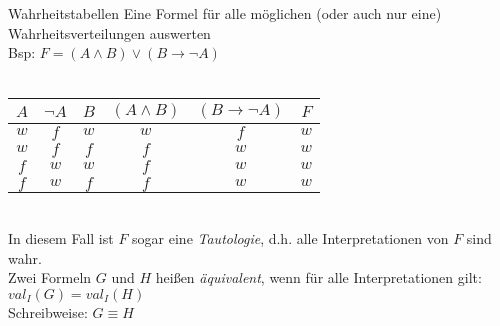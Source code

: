 \begin{frame}{Wahrheitstabellen}
 Eine Formel für alle möglichen (oder auch nur eine) Wahrheitsverteilungen auswerten\\
 Bsp: $F = (A\wedge B)\vee(B\rightarrow\neg A)$\\
 \textcolor{white}{.}\\ %
 \begin{tabular}{ccc|cc|c}
  $A$ & $\neg A$ & $B$ & $(A\wedge B)$ & $(B\rightarrow\neg A)$ & $F$ \\
  \hline
  $w$ & $f$      & $w$ & $w$           & $f$                    & $w$ \\
  $w$ & $f$      & $f$ & $f$           & $w$                    & $w$ \\
  $f$ & $w$      & $w$ & $f$           & $w$                    & $w$ \\
  $f$ & $w$      & $f$ & $f$           & $w$                    & $w$ \\
 \end{tabular}\\
 In diesem Fall ist $F$ sogar eine \emph{Tautologie}, d.h. alle Interpretationen von $F$ sind wahr.\\
 Zwei Formeln $G$ und $H$ heißen \emph{äquivalent}, wenn für alle Interpretationen gilt: $val_{I}(G) = val_{I}(H)$\\
 Schreibweise: $G\equiv H$\\
\end{frame}

